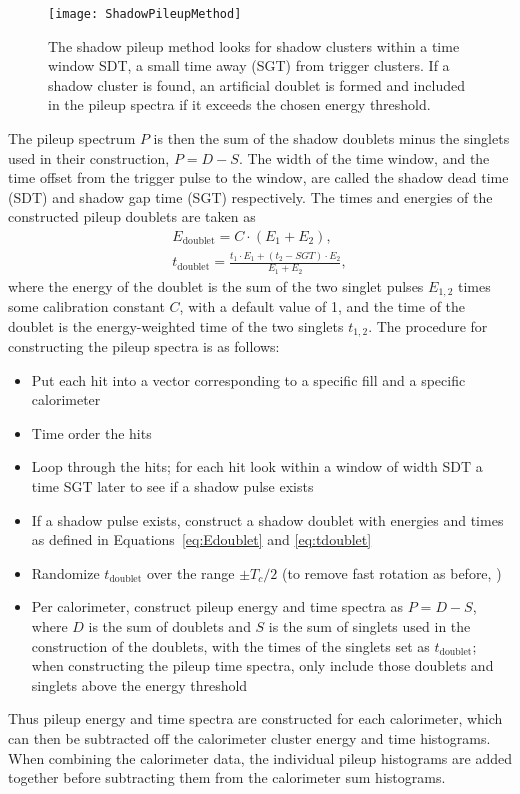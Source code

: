 \begin{figure}
    \centering
    \texttt{[image: ShadowPileupMethod]}
    \caption[Shadow pileup method]{The shadow pileup method looks for shadow clusters within a time window SDT, a small time away (SGT) from trigger clusters. If a shadow cluster is found, an artificial doublet is formed and included in the pileup spectra if it exceeds the chosen energy threshold.}
    \label{fig:ShadowPileupMethod}
\end{figure}

The pileup spectrum $P$ is then the sum of the shadow doublets minus the singlets used in their construction, $P = D - S$. The width of the time window, and the time offset from the trigger pulse to the window, are called the shadow dead time (SDT) and shadow gap time (SGT) respectively. The times and energies of the constructed pileup doublets are taken as
            \begin{gather}
                E_{\text{doublet}} = C \cdot (E_{1} + E_{2}), \label{eq:Edoublet} \\
                t_{\text{doublet}} = \frac{t_{1} \cdot E_{1} + (t_{2}-SGT) \cdot E_{2}}{E_{1} + E_{2}}, \label{eq:tdoublet}
            \end{gather}
where the energy of the doublet is the sum of the two singlet pulses $E_{1,2}$ times some calibration constant $C$, with a default value of 1, and the time of the doublet is the energy-weighted time of the two singlets $t_{1,2}$. The procedure for constructing the pileup spectra is as follows:
\begin{itemize}
    \item{Put each hit into a vector corresponding to a specific fill and a specific calorimeter}
    \item{Time order the hits}
    \item{Loop through the hits; for each hit look within a window of width SDT a time SGT later to see if a shadow pulse exists}
    \item{If a shadow pulse exists, construct a shadow doublet with energies and times as defined in Equations~\ref{eq:Edoublet} and \ref{eq:tdoublet}}
    \item{Randomize $t_{\text{doublet}}$ over the range $\pm T_{c}/2$ (to remove fast rotation as before, )}
    \item{Per calorimeter, construct pileup energy and time spectra as $P = D - S$, where $D$ is the sum of doublets and $S$ is the sum of singlets used in the construction of the doublets, with the times of the singlets set as $t_{\text{doublet}}$; when constructing the pileup time spectra, only include those doublets and singlets above the energy threshold}
\end{itemize}
Thus pileup energy and time spectra are constructed for each calorimeter, which can then be subtracted off the calorimeter cluster energy and time histograms. When combining the calorimeter data, the individual pileup histograms are added together before subtracting them from the calorimeter sum histograms.



